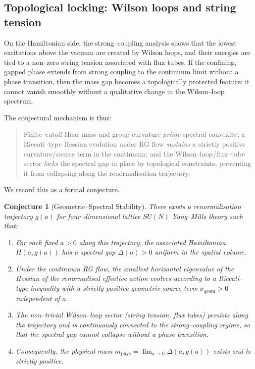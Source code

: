 \documentclass[11pt]{article}
\numberwithin{equation}{section}
\newtheorem{conjecture}[theorem]{Conjecture}
\begin{document}
\subsection{Topological locking: Wilson loops and string tension}

On the Hamiltonian side, the strong--coupling analysis shows that the
lowest excitations above the vacuum are created by Wilson loops, and
their energies are tied to a non--zero string tension associated with
flux tubes.  If the confining, gapped phase extends from strong coupling
to the continuum limit without a phase transition, then the mass gap
becomes a topologically protected feature: it cannot vanish smoothly
without a qualitative change in the Wilson--loop spectrum.

The conjectural mechanism is thus:

\begin{quote}
Finite--cutoff Haar mass and group curvature \emph{prime} spectral
convexity; a Riccati--type Hessian evolution under RG flow \emph{sustains}
a strictly positive curvature/source term in the continuum; and the
Wilson--loop/flux--tube sector \emph{locks} the spectral gap in place by
topological constraints, preventing it from collapsing along the
renormalisation trajectory.
\end{quote}

We record this as a formal conjecture.

\begin{conjecture}[Geometric--Spectral Stability]
\label{conj:GSS}
There exists a renormalisation trajectory $g(a)$ for four--dimensional
lattice $SU(N)$ Yang--Mills theory such that:

\begin{enumerate}
  \item For each fixed $a>0$ along this trajectory, the associated
  Hamiltonian $H(a,g(a))$ has a spectral gap $\Delta(a)>0$ uniform in
  the spatial volume.

  \item Under the continuum RG flow, the smallest horizontal eigenvalue
  of the Hessian of the renormalised effective action evolves according
  to a Riccati--type inequality with a strictly positive geometric
  source term $\sigma_{\mathrm{geom}}>0$ independent of $a$.

  \item The non--trivial Wilson--loop sector (string tension, flux
  tubes) persists along the trajectory and is continuously connected to
  the strong--coupling regime, so that the spectral gap cannot collapse
  without a phase transition.

  \item Consequently, the physical mass
  $m_{\mathrm{phys}} = \lim_{a\to 0}\Delta(a,g(a))$ exists and is
  strictly positive.
\end{enumerate}
\end{conjecture}
\end{document}
